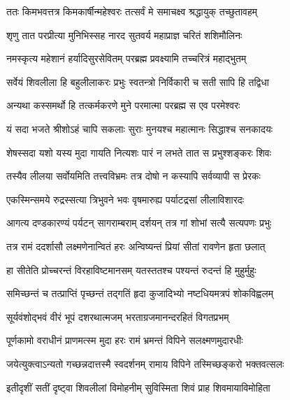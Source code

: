 \twolineshloka
{ततः किमभवत्तत्र किमकार्षीन्महेश्वरः}
{तत्सर्वं मे समाचक्ष्व श्रद्धायुक् तच्छुतावहम्} %


\twolineshloka
{शृणु तात परप्रीत्या मुनिभिस्सह नारद}
{सुतवर्य महाप्राज्ञ चरितं शशिमौलिनः} %

\twolineshloka
{नमस्कृत्य महेशानं हर्यादिसुरसेवितम्}
{परब्रह्म प्रवक्ष्यामि तच्चरित्रं महाद्भुतम्} %

\twolineshloka
{सर्वेयं शिवलीला हि बहुलीलाकरः प्रभुः}
{स्वतन्त्रो निर्विकारी च सती सापि हि तद्विधा} %

\twolineshloka
{अन्यथा कस्समर्थो हि तत्कर्मकरणे मुने}
{परमात्मा परब्रह्म स एव परमेश्वरः} %

\twolineshloka
{यं सदा भजते श्रीशोऽहं चापि सकलाः सुराः}
{मुनयश्च महात्मानः सिद्धाश्च सनकादयः} %

\twolineshloka
{शेषस्सदा यशो यस्य मुदा गायति नित्यशः}
{पारं न लभते तात स प्रभुश्शङ्करः शिवः} %

\twolineshloka
{तस्यैव लीलया सर्वोयमिति तत्त्वविभ्रमः}
{तत्र दोषो न कस्यापि सर्वव्यापी स प्रेरकः} %

\twolineshloka
{एकस्मिन्समये रुद्रस्सत्या त्रिभुवने भवः}
{वृषमारुह्य पर्याटद्रसां लीलाविशारदः} %

\twolineshloka
{आगत्य दण्डकारण्यं पर्यटन् सागराम्बराम्}
{दर्शयन् तत्र गां शोभां सत्यै सत्यपणः प्रभुः} %

\twolineshloka
{तत्र रामं ददर्शासौ लक्ष्मणेनान्वितं हरः}
{अन्विष्यन्तं प्रियां सीतां रावणेन हृता छलात्} %

\twolineshloka
{हा सीतेति प्रोच्चरन्तं विरहाविष्टमानसम्}
{यतस्ततश्च पश्यन्तं रुदन्तं हि मुहुर्मुहुः} %

\twolineshloka
{समिच्छन्तं च तत्प्राप्तिं पृच्छन्तं तद्गतिं हृदा}
{कुजादिभ्यो नष्टधियमत्रपं शोकविह्वलम्} %

\twolineshloka
{सूर्यवंशोद्भवं वीरं भूपं दशरथात्मजम्}
{भरताग्रजमानन्दरहितं विगतप्रभम्} %

\twolineshloka
{पूर्णकामो वराधीनं प्राणमत्स्म मुदा हरः}
{रामं भ्रमन्तं विपिने सलक्ष्मणमुदारधीः} %

\twolineshloka
{जयेत्युक्त्वाऽन्यतो गच्छन्नदात्तस्मै स्वदर्शनम्}
{रामाय विपिने तस्मिच्छङ्करो भक्तवत्सलः} %

\twolineshloka
{इतीदृशीं सतीं दृष्ट्वा शिवलीलां विमोहनीम्}
{सुविस्मिता शिवं प्राह शिवमायाविमोहिता} %


